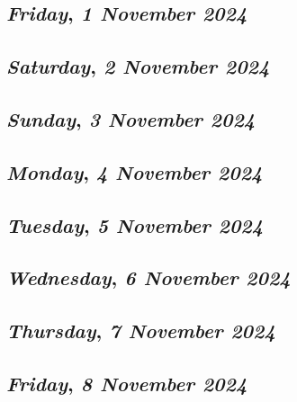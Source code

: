 \begin{center}
\section*{\month}
\end{center}

\def\day{\textit{1 November 2024}}
\def\weekday{\textit{Friday}}
\subsection*{\weekday, \day}

\def\day{\textit{2 November 2024}}
\def\weekday{\textit{Saturday}}
\subsection*{\weekday, \day}

\def\day{\textit{3 November 2024}}
\def\weekday{\textit{Sunday}}
\subsection*{\weekday, \day}

\def\day{\textit{4 November 2024}}
\def\weekday{\textit{Monday}}
\subsection*{\weekday, \day}

\def\day{\textit{5 November 2024}}
\def\weekday{\textit{Tuesday}}
\subsection*{\weekday, \day}

\def\day{\textit{6 November 2024}}
\def\weekday{\textit{Wednesday}}
\subsection*{\weekday, \day}

\def\day{\textit{7 November 2024}}
\def\weekday{\textit{Thursday}}
\subsection*{\weekday, \day}

\def\day{\textit{8 November 2024}}
\def\weekday{\textit{Friday}}
\subsection*{\weekday, \day}

